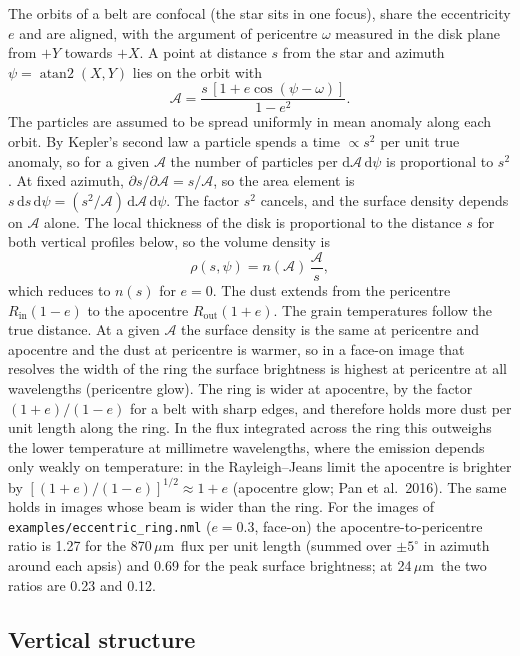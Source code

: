\documentclass[11pt,a4paper]{article}
\newcommand{\code}[1]{\texttt{#1}}
\newcommand{\um}{\,$\mu$m}
\newcommand{\dd}{\mathrm{d}}
\begin{document}
The orbits of a belt are confocal (the star sits in one focus), share the eccentricity $e$ and
are aligned, with the argument of pericentre $\omega$ measured in the disk plane from $+Y$
towards $+X$. A point at distance $s$ from the star and azimuth $\psi=\operatorname{atan2}(X,Y)$
lies on the orbit with
\begin{equation}
\mathcal{A} = \frac{s\,[1+e\cos(\psi-\omega)]}{1-e^2}.
\label{eq:aorb}
\end{equation}
The particles are assumed to be spread uniformly in mean anomaly along each orbit. By Kepler's
second law a particle spends a time $\propto s^2$ per unit true anomaly, so for a given
$\mathcal{A}$ the number of particles per $\dd\mathcal{A}\,\dd\psi$ is proportional to $s^2$. At fixed azimuth,
$\partial s/\partial\mathcal{A}=s/\mathcal{A}$, so the area element is
$s\,\dd s\,\dd\psi=(s^2/\mathcal{A})\,\dd\mathcal{A}\,\dd\psi$. The factor $s^2$ cancels, and the
surface density depends on $\mathcal{A}$ alone. The local thickness of the disk is proportional
to the distance $s$ for both vertical profiles below, so the volume density is
\begin{equation}
\rho(s,\psi) = n(\mathcal{A})\,\frac{\mathcal{A}}{s},
\label{eq:eccdens}
\end{equation}
which reduces to $n(s)$ for $e=0$. The dust extends from the pericentre
$R_\mathrm{in}(1-e)$ to the apocentre $R_\mathrm{out}(1+e)$. The grain temperatures follow the true
distance. At a given $\mathcal{A}$ the surface density is the same at pericentre and apocentre and
the dust at pericentre is warmer, so in a face-on image that resolves the width of the ring the
surface brightness is highest at pericentre at all wavelengths (pericentre glow). The ring is
wider at apocentre, by the factor $(1+e)/(1-e)$ for a belt with sharp edges, and therefore holds
more dust per unit length along the ring. In the flux integrated across the ring this outweighs
the lower temperature at millimetre wavelengths, where the emission depends only weakly on
temperature: in the Rayleigh--Jeans limit the apocentre is brighter by $[(1+e)/(1-e)]^{1/2}
\approx 1+e$ (apocentre glow; Pan et al.\ 2016). The same holds in images whose beam is wider
than the ring. For the images of \code{examples/eccentric\_ring.nml} ($e=0.3$, face-on) the
apocentre-to-pericentre ratio is 1.27 for the 870\um\ flux per unit length (summed over
$\pm5^\circ$ in azimuth around each apsis) and 0.69 for the peak surface brightness; at 24\um\ the
two ratios are 0.23 and 0.12.

\subsection{Vertical structure}
\end{document}

